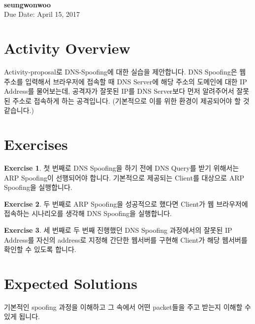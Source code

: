 \documentclass[a4paper, 11pt]{article}
\theoremstyle{definition}
\newtheorem{exercise}{Exercise}
\begin{document}
 \\
         {\phantom{} \hfill \textbf{seungwonwoo}} \\
         {\phantom{} \hfill Due Date: April 15, 2017} \\

\section{Activity Overview}

Activity-proposal로 DNS-Spoofing에 대한 실습을 제안합니다. DNS Spoofing은 웹 주소를 입력해서 브라우저에 접속할 때 DNS Server에 해당 주소의 도메인에 대한 IP Address를 물어보는데, 공격자가 잘못된 IP를 DNS Server보다 먼저 알려주어서 잘못된 주소로 접속하게 하는 공격입니다. (기본적으로 이를 위한 환경이 제공되어야 할 것 같습니다.)

\section{Exercises}

\begin{exercise}

  첫 번째로 DNS Spoofing을 하기 전에 DNS Query를 받기 위해서는 ARP Spoofing이 선행되어야 합니다. 기본적으로 제공되는 Client를 대상으로 ARP Spoofing을 실행합니다.

\end{exercise}

\begin{exercise}

  두 번째로 ARP Spoofing을 성공적으로 했다면 Client가 웹 브라우저에 접속하는 시나리오를 생각해 DNS Spoofing을 실행합니다.

\end{exercise}

\begin{exercise}

  세 번째로 두 번째 진행했던 DNS Spoofing 과정에서의 잘못된 IP Address를 자신의 address로 지정해 간단한 웹서버를 구현해 Client가 해당 웹서버를 확인할 수 있도록 합니다.

\end{exercise}

\section{Expected Solutions}

  기본적인 spoofing 과정을 이해하고 그 속에서 어떤 packet들을 주고 받는지 이해할 수 있게 됩니다.



\end{document}
